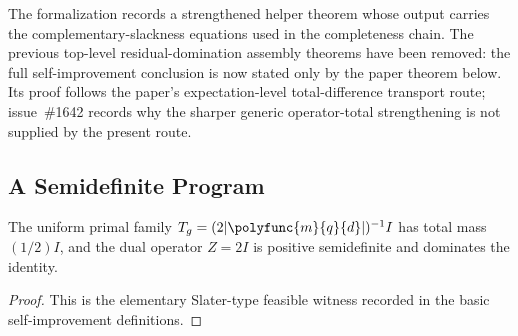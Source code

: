 \begin{remark}\label{rem:self-improvement-helper-with-slackness-theorem}
  The formalization records a strengthened helper theorem whose output carries
  the complementary-slackness equations used in the completeness chain.  The
  previous top-level residual-domination assembly theorems have been removed:
  the full self-improvement conclusion is now stated only by the paper theorem
  below.  Its proof follows the paper's expectation-level total-difference
  transport route; issue~\#1642 records why the sharper generic operator-total
  strengthening is not supplied by the present route.
\end{remark}

\subsection{A Semidefinite Program}

\begin{lemma}\label{lem:sdp-uniform-feasible-witness}
  \leanok
  The uniform primal family
  \(T_g=(2|\polyfunc{m}{q}{d}|)^{-1}I\) has total mass \((1/2)I\), and the dual
  operator \(Z=2I\) is positive semidefinite and dominates the identity.
\end{lemma}
\begin{proof}
  \leanok
  This is the elementary Slater-type feasible witness recorded in the basic
  self-improvement definitions.
\end{proof}

